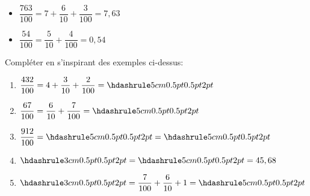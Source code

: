 \documentclass[activite]{thedocument}
\begin{document}
    \begin{mdframed}
        \begin{itemize}[label=$\bullet$]
        \item$\dfrac{763}{100}=7+\dfrac{6}{10}+\dfrac{3}{100}=7,63$
        \item$\dfrac{54}{100}=\dfrac{5}{10}+\dfrac{4}{100}=0,54$
        \end{itemize}
    \end{mdframed}
    \vspace{0.5cm}
    Compléter en s'inspirant des exemples ci-dessus:
    \begin{enumerate}[label=(\alph*)]
        \item$\dfrac{432}{100}=4+\dfrac{3}{10}+\dfrac{2}{100}=\doted{5cm}$
        \item$\dfrac{67}{100}=\dfrac{6}{10}+\dfrac{7}{100}=\doted{5cm}$
        \item$\dfrac{912}{100}=\doted{5cm}=\doted{5cm}$
        \item$\doted{3cm}=\doted{5cm}=45,68$
        \item$\doted{3cm}=\dfrac{7}{100}+\dfrac{6}{10}+1=\doted{5cm}$
    \end{enumerate}
\end{document}
